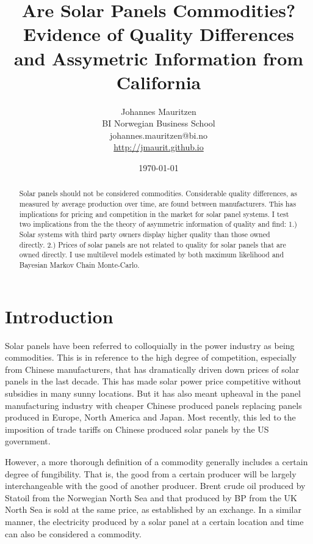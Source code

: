 \documentclass[12pt]{article}
\title{Are Solar Panels Commodities? Evidence of Quality Differences and Assymetric Information from California}
\date{\today}
\author{Johannes Mauritzen \\ BI Norwegian Business School \\ johannes.mauritzen@bi.no\\\url{http://jmaurit.github.io}}
\begin{document}
 \begin{spacing}{1} %
	\maketitle

\begin{abstract}
 Solar panels should not be considered commodities. Considerable quality differences, as measured by average production over time, are found between manufacturers. This has implications for pricing and competition in the market for solar panel systems. I test two implications from the the theory of asymmetric information of quality and find: 1.) Solar systems with third party owners display higher quality than those owned directly. 2.) Prices of solar panels are not related to quality for solar panels that are owned directly. I use multilevel models estimated by both maximum likelihood and Bayesian Markov Chain Monte-Carlo.
\end{abstract}

 \end{spacing}

\section{Introduction}

Solar panels have been referred to colloquially in the power industry as being commodities. This is in reference to the high degree of competition, especially from Chinese manufacturers, that has dramatically driven down prices of solar panels in the last decade. This has made solar power price competitive without subsidies in many sunny locations. But it has also meant upheaval in the panel manufacturing industry with cheaper Chinese produced panels replacing panels produced in Europe, North America and Japan. Most recently, this led to the imposition of trade tariffs on Chinese produced solar panels by the US government.

However, a more thorough definition of a commodity generally includes a certain degree of fungibility. That is, the good from a certain producer will be largely interchangeable with the good of another producer. Brent crude oil produced by Statoil from the Norwegian North Sea and that produced by BP from the UK North Sea is sold at the same price, as established by an exchange. In a similar manner, the electricity produced by a solar panel at a certain location and time can also be considered a commodity.
\end{document}
